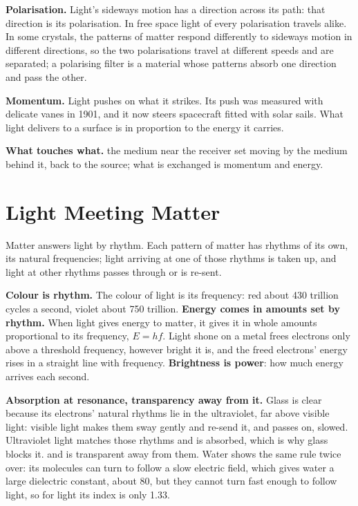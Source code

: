 \documentclass[11pt,a4paper]{article}
\begin{document}
\textbf{Polarisation.} Light's sideways motion has a direction across its path: that direction is its polarisation. In free space light of every polarisation travels alike. In some crystals, the patterns of matter respond differently to sideways motion in different directions, so the two polarisations travel at different speeds and are separated; a polarising filter is a material whose patterns absorb one direction and pass the other.

\textbf{Momentum.} Light pushes on what it strikes. Its push was measured with delicate vanes in 1901, and it now steers spacecraft fitted with solar sails. What light delivers to a surface is  in proportion to the energy it carries.

\textbf{What touches what.}  the medium near the receiver set moving by the medium behind it, back to the source; what is exchanged is momentum and energy.

\section{Light Meeting Matter}

Matter answers light by rhythm. Each pattern of matter has rhythms of its own, its natural frequencies; light arriving at one of those rhythms is taken up, and light at other rhythms passes through or is re-sent.

\textbf{Colour is rhythm.} The colour of light is its frequency: red about 430 trillion cycles a second, violet about 750 trillion. \textbf{Energy comes in amounts set by rhythm.} When light gives energy to matter, it gives it in whole amounts proportional to its frequency, $E = hf$. Light shone on a metal frees electrons only above a threshold frequency, however bright it is, and the freed electrons' energy rises in a straight line with frequency. \textbf{Brightness is power}: how much energy arrives each second.

\textbf{Absorption at resonance, transparency away from it.} Glass is clear because its electrons' natural rhythms lie in the ultraviolet, far above visible light: visible light makes them sway gently and re-send it, and passes on, slowed. Ultraviolet light matches those rhythms and is absorbed, which is why glass blocks it.  and is transparent away from them. Water shows the same rule twice over: its molecules can turn to follow a slow electric field, which gives water a large dielectric constant, about 80, but they cannot turn fast enough to follow light, so for light its index is only 1.33.
\end{document}
